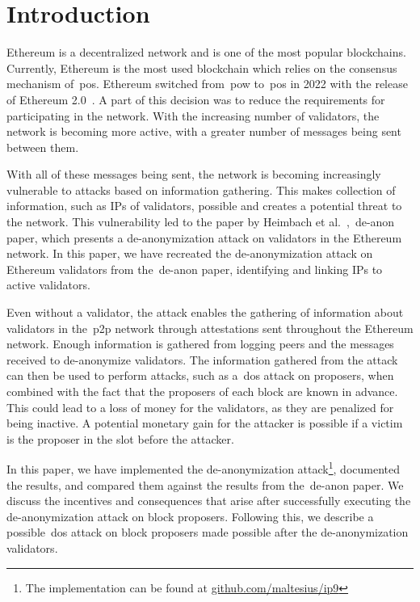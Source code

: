 

\section{Introduction}\label{sec:introduction}
Ethereum is a decentralized network and is one of the most popular blockchains.
Currently, Ethereum is the most used blockchain which relies on the consensus mechanism of~\gls{pos}.
Ethereum switched from~\gls{pow} to~\gls{pos} in 2022 with the release of Ethereum 2.0~\cite{EthereumProof-of-stakePoS}.
A part of this decision was to reduce the requirements for participating in the network.
With the increasing number of validators, the network is becoming more active, with a greater number of messages being sent between them.


With all of these messages being sent, the network is becoming increasingly vulnerable to attacks based on information gathering.
This makes collection of information, such as IPs of validators, possible and creates a potential threat to the network.
This vulnerability led to the paper by Heimbach et al.~\cite{heimbach2024deanonymizingethereumvalidatorsp2p},~\gls{de-anon paper}, which presents a de-anonymization attack on validators in the Ethereum network.
In this paper, we have recreated the de-anonymization attack on Ethereum validators from the~\gls{de-anon paper}, identifying and linking IPs to active validators.


Even without a validator, the attack enables the gathering of information about validators in the~\gls{p2p} network through attestations sent throughout the Ethereum network.
Enough information is gathered from logging peers and the messages received to de-anonymize validators.
The information gathered from the attack can then be used to perform attacks, such as a~\gls{dos} attack on proposers, when combined with the fact that the proposers of each block are known in advance.
This could lead to a loss of money for the validators, as they are penalized for being inactive.
A potential monetary gain for the attacker is possible if a victim is the proposer in the slot before the attacker.

In this paper, we have implemented the de-anonymization attack\footnote{The implementation can be found at \href{https://github.com/Maltesius/IP9}{github.com/maltesius/ip9}}, documented the results, and compared them against
the results from the~\gls{de-anon paper}.
We discuss the incentives and consequences that arise after successfully executing the de-anonymization attack on block proposers.
Following this, we describe a possible~\gls{dos} attack on block proposers made possible after the de-anonymization validators.


